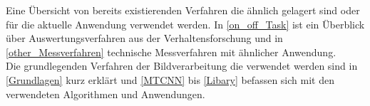 Eine Übersicht von bereits existierenden Verfahren die ähnlich gelagert sind oder für die aktuelle Anwendung verwendet werden. In \autoref{on_off_Task} ist ein Überblick über Auswertungsverfahren aus der Verhaltensforschung und in \autoref{other_Messverfahren} technische Messverfahren mit ähnlicher Anwendung.\\
Die grundlegenden Verfahren der Bildverarbeitung die verwendet werden sind in \autoref{Grundlagen} kurz erklärt und \autoref{MTCNN} bis \autoref{Libary} befassen sich mit den verwendeten Algorithmen und Anwendungen.